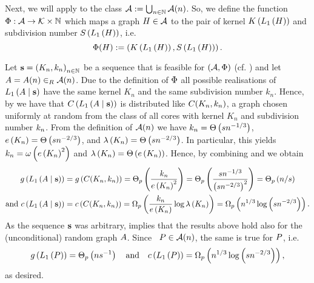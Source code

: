 Next, we will apply  to the class $\mathcal{A}:=\bigcup_{n\in\mathbb{N}}\mathcal{A}(n)$. So, we define the function $\Phi:\mathcal{A} \to \mathcal{K} \times \mathbb{N}$ which maps a graph $H \in \mathcal{A}$ to the pair of kernel $K\left(L_1\left(H\right)\right)$ and subdivision number $S\left(L_1\left(H\right)\right)$, i.e. \[\Phi(H):=\left(K\left(L_1\left(H\right)\right), S\left(L_1\left(H\right)\right)\right).\] 

Let $\mathbf{s}=\left(K_n, k_n\right)_{n \in \mathbb{N}}$ be a sequence that is feasible for $\left(\mathcal{A}, \Phi\right)$ (cf. ) and let $A=A(n)\in_R \mathcal{A}(n)$. Due to the definition of $\Phi$ all possible realisations of $L_1\left(A \mid \mathbf{s}\right)$ have the same kernel $K_n$ and the same subdivision number $k_n$. Hence, by  we have that $C\left(L_1\left(A \mid \mathbf{s}\right)\right)$ is distributed like $C(K_n, k_n)$, a graph chosen uniformly at random from the class of all cores with kernel $K_n$ and subdivision number $k_n$. From the definition of $\mathcal{A}(n)$ we have $k_n=\Theta\left(sn^{-1/3}\right)$, $e\left({K_n}\right)=\Theta\left(sn^{-2/3}\right)$, and $\lambda\left(K_n\right)=\Theta\left(sn^{-2/3}\right)$. In particular, this yields $k_n=\omega\left(e\left({K_n}\right)^2\right)$ and $\lambda\left(K_n\right)=\Theta\left(e\left({K_n}\right)\right)$. Hence, by combining  and  we obtain 
\begin{align*}
g\left({L_1\left(A \mid \mathbf{s}\right)}\right)&=g\left({C(K_n, k_n)}\right)=\Theta_p\left(\frac{k_n}{e\left({K_n}\right)^2}\right)=\Theta_p\left(\frac{sn^{-1/3}}{\left(sn^{-2/3}\right)^2}\right)=\Theta_p\left(n/s\right)\\
\text{and }
c\left({L_1\left(A \mid \mathbf{s}\right)}\right)&=c\left({C(K_n, k_n)}\right)=\Omega_p\left(\frac{k_n}{e\left({K_n}\right)}\log \lambda\left(K_n\right) \right)=\Omega_p\left(n^{1/3}\log \left(sn^{-2/3}\right)\right).
\end{align*}
As the sequence $\mathbf{s}$ was arbitrary,  implies that the results above hold also for the (unconditional) random graph $A$. Since \whp\ $P \in \mathcal{A}(n)$, the same is true for $P$, i.e. \[g\left({L_1\left(P\right)}\right)=\Theta_p\left(ns^{-1}\right)\quad \text{and}\quad c\left({L_1\left(P\right)}\right)=\Omega_p\left(n^{1/3}\log \left(sn^{-2/3}\right)\right),\]
as desired.

